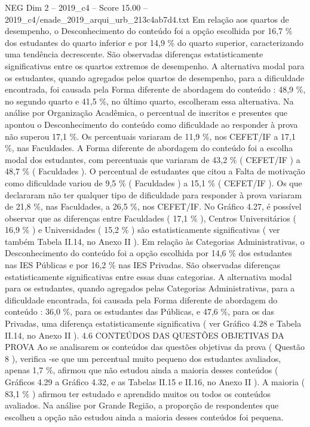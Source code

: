 \begin{textsample}{NEG Dim 2 – 2019\_c4 – Score 15.00 – 2019\_c4/enade\_2019\_arqui\_urb\_213c4ab7d4.txt}
Em relação aos quartos de desempenho, o Desconhecimento do conteúdo foi a opção escolhida por 16,7 \% dos estudantes do quarto inferior e por 14,9 \% do quarto superior, caracterizando uma tendência decrescente.
São observadas diferenças estatisticamente significativas entre os quartos extremos de desempenho.
A alternativa modal para os estudantes, quando agregados pelos quartos de desempenho, para a dificuldade encontrada, foi causada pela Forma diferente de abordagem do conteúdo : 48,9 \%, no segundo quarto e 41,5 \%, no último quarto, escolheram essa alternativa.
Na análise por Organização Acadêmica, o percentual de inscritos e presentes que apontou o Desconhecimento do conteúdo como dificuldade ao responder à prova não superou 17,1 \%.
Os percentuais variaram de 11,9 \%, nos CEFET/IF a 17,1 \%, nas Faculdades.
A Forma diferente de abordagem do conteúdo foi a escolha modal dos estudantes, com percentuais que variaram de 43,2 \% ( CEFET/IF ) a 48,7 \% ( Faculdades ).
O percentual de estudantes que citou a Falta de motivação como dificuldade variou de 9,5 \% ( Faculdades ) a 15,1 \% ( CEFET/IF ).
Os que declararam não ter qualquer tipo de dificuldade para responder à prova variaram de 21,8 \%, nas Faculdades, a 26,5 \%, nos CEFET/IF.
No Gráfico 4.27, é possível observar que as diferenças entre Faculdades ( 17,1 \% ), Centros Universitários ( 16,9 \% ) e Universidades ( 15,2 \% ) são estatisticamente significativas ( ver também Tabela II.14, no Anexo II ).
Em relação às Categorias Administrativas, o Desconhecimento do conteúdo foi a opção escolhida por 14,6 \% dos estudantes nas IES Públicas e por 16,2 \% nas IES Privadas.
São observadas diferenças estatisticamente significativas entre essas duas categorias.
A alternativa modal para os estudantes, quando agregados pelas Categorias Administrativas, para a dificuldade encontrada, foi causada pela Forma diferente de abordagem do conteúdo : 36,0 \%, para os estudantes das Públicas, e 47,6 \%, para os das Privadas, uma diferença estatisticamente significativa ( ver Gráfico 4.28 e Tabela II.14, no Anexo II ). 4.6 CONTEÚDOS DAS QUESTÕES OBJETIVAS DA PROVA Ao se analisarem os conteúdos das questões objetivas da prova ( Questão 8 ), verifica -se que um percentual muito pequeno dos estudantes avaliados, apenas 1,7 \%, afirmou que não estudou ainda a maioria desses conteúdos ( Gráficos 4.29 a Gráfico 4.32, e as Tabelas II.15 e II.16, no Anexo II ).
A maioria ( 83,1 \% ) afirmou ter estudado e aprendido muitos ou todos os conteúdos avaliados.
Na análise por Grande Região, a proporção de respondentes que escolheu a opção não estudou ainda a maioria desses conteúdos foi pequena.

\end{textsample}
